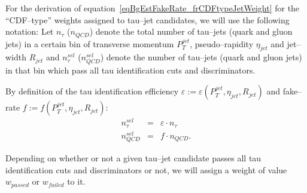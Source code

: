 For the derivation of equation~\ref{eqBgEstFakeRate_frCDFtypeJetWeight} for the
``CDF--type'' weights assigned to tau--jet candidates, we will use the following
notation: Let $n_{\tau}$ ($n_{QCD}$) denote the total number of tau--jets (quark
and gluon jets) in a certain bin of transverse momentum $P_{T}^{jet}$,
pseudo--rapidity $\eta_{jet}$ and jet--width $R_{jet}$ and $n_{\tau}^{sel}$
($n_{QCD}^{sel}$) denote the number of tau--jets (quark and gluon jets) in that
bin which pass all tau identification cuts and discriminators.

By definition of the tau identification efficiency $\varepsilon := \varepsilon
\left( P_{T}^{jet}, \eta_{jet}, R_{jet} \right)$ and fake--rate $f := f \left(
P_{T}^{jet}, \eta_{jet}, R_{jet} \right)$:
\begin{eqnarray}
n_{\tau}^{sel} & = & \varepsilon \cdot n_{\tau} \nonumber \\
n_{QCD}^{sel} & = & f \cdot n_{QCD}.
\label{eqBgEstFakeRate_eff_and_frDef}
\end{eqnarray}

Depending on whether or not a given tau--jet candidate passes all tau
identification cuts and discriminators or not, we will assign a weight of value
$w_{passed}$ or $w_{failed}$ to it.

